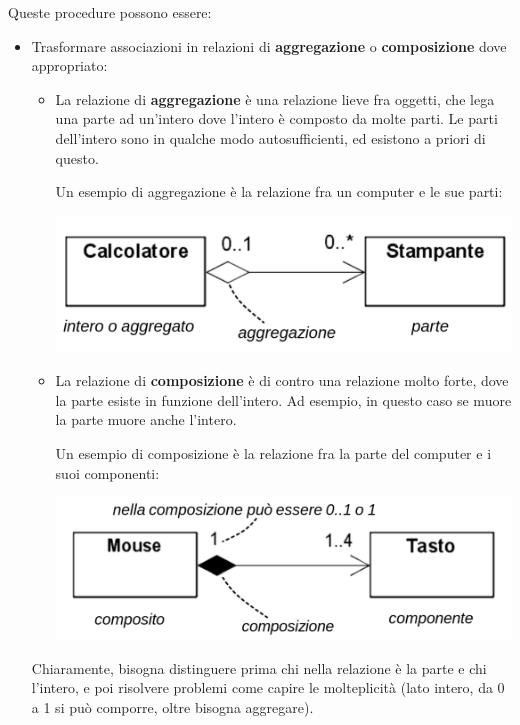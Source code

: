 \documentclass[a4paper,11pt]{article}
\begin{document}
Queste procedure possono essere:
\begin{itemize}
	\item Trasformare associazioni in relazioni di \textbf{aggregazione} o \textbf{composizione} dove appropriato:

		\begin{itemize}
			\item La relazione di \textbf{aggregazione} è una relazione lieve fra oggetti, che lega una parte ad un'intero dove l'intero è composto da molte parti.
Le parti dell'intero sono in qualche modo autosufficienti, ed esistono a priori di questo.

Un esempio di aggregazione è la relazione fra un computer e le sue parti:
\begin{center}
	\includegraphics[scale=0.3]{../figures/aggregazione.png}
\end{center}

			\item La relazione di \textbf{composizione} è di contro una relazione molto forte, dove la parte esiste in funzione dell'intero. Ad esempio, in questo caso se muore la parte muore anche l'intero.

	Un esempio di composizione è la relazione fra la parte del computer e i suoi componenti:
\begin{center}
	\includegraphics[scale=0.3]{../figures/composizione.png}
\end{center}
		\end{itemize}

		Chiaramente, bisogna distinguere prima chi nella relazione è la parte e chi l'intero, e poi risolvere problemi come capire le molteplicità (lato intero, da 0 a 1 si può comporre, oltre bisogna aggregare).


\end{itemize}
\end{document}
